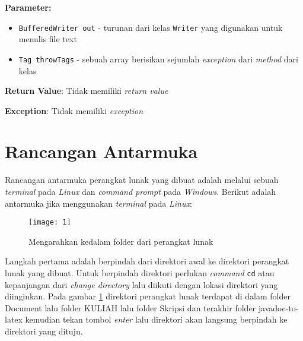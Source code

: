 \begin{enumerate}
\begin{itemize}
\textbf{Parameter:}
\begin{itemize}
\item \texttt{BufferedWriter out} - 
turunan dari kelas \texttt{Writer} yang digunakan untuk menulis file text
\item \texttt{Tag throwTags} - 
sebuah array berisikan sejumlah \textit{exception} dari \textit{method} dari kelas
\end{itemize}
\textbf{Return Value}: Tidak memiliki \textit{return value}

\textbf{Exception}: Tidak memiliki \textit{exception}

\end{itemize}
\end{enumerate}

\section{Rancangan Antarmuka}
\label{sec:antarmuka}
Rancangan antarmuka perangkat lunak yang dibuat adalah melalui sebuah {\it terminal} pada {\it Linux} dan {\it command prompt} pada {\it Windows}. Berikut adalah antarmuka jika menggunakan {\it terminal} pada {\it Linux}: 

\begin{figure}[H]
	\centering  
	\texttt{[image: 1]}  
	\caption[]{Mengarahkan kedalam folder dari perangkat lunak} 
	\label{fig:1} 
\end{figure}
Langkah pertama adalah berpindah dari direktori awal ke direktori perangkat lunak yang dibuat. Untuk berpindah direktori perlukan {\it command} \texttt{cd} atau kepanjangan dari {\it change directory} lalu diikuti dengan lokasi direktori yang diinginkan. Pada gambar \ref{fig:1} direktori perangkat lunak terdapat di dalam folder Document lalu folder KULIAH lalu folder Skripsi dan terakhir folder javadoc-to-latex kemudian tekan tombol {\it enter} lalu direktori akan langsung berpindah ke direktori yang dituju.

